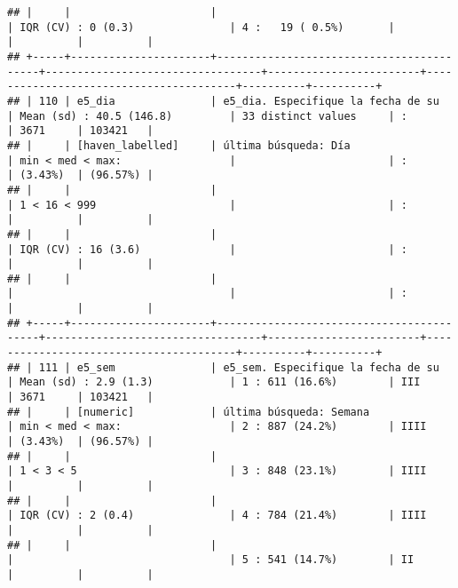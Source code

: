 \documentclass[]{article}
\begin{document}
\begin{verbatim}
## |     |                      |                                          | IQR (CV) : 0 (0.3)               | 4 :   19 ( 0.5%)       |                                        |          |          |
## +-----+----------------------+------------------------------------------+----------------------------------+------------------------+----------------------------------------+----------+----------+
## | 110 | e5_dia               | e5_dia. Especifique la fecha de su       | Mean (sd) : 40.5 (146.8)         | 33 distinct values     | :                                      | 3671     | 103421   |
## |     | [haven_labelled]     | última búsqueda: Día                     | min < med < max:                 |                        | :                                      | (3.43%)  | (96.57%) |
## |     |                      |                                          | 1 < 16 < 999                     |                        | :                                      |          |          |
## |     |                      |                                          | IQR (CV) : 16 (3.6)              |                        | :                                      |          |          |
## |     |                      |                                          |                                  |                        | :                                      |          |          |
## +-----+----------------------+------------------------------------------+----------------------------------+------------------------+----------------------------------------+----------+----------+
## | 111 | e5_sem               | e5_sem. Especifique la fecha de su       | Mean (sd) : 2.9 (1.3)            | 1 : 611 (16.6%)        | III                                    | 3671     | 103421   |
## |     | [numeric]            | última búsqueda: Semana                  | min < med < max:                 | 2 : 887 (24.2%)        | IIII                                   | (3.43%)  | (96.57%) |
## |     |                      |                                          | 1 < 3 < 5                        | 3 : 848 (23.1%)        | IIII                                   |          |          |
## |     |                      |                                          | IQR (CV) : 2 (0.4)               | 4 : 784 (21.4%)        | IIII                                   |          |          |
## |     |                      |                                          |                                  | 5 : 541 (14.7%)        | II                                     |          |          |

\end{verbatim}
\end{document}
